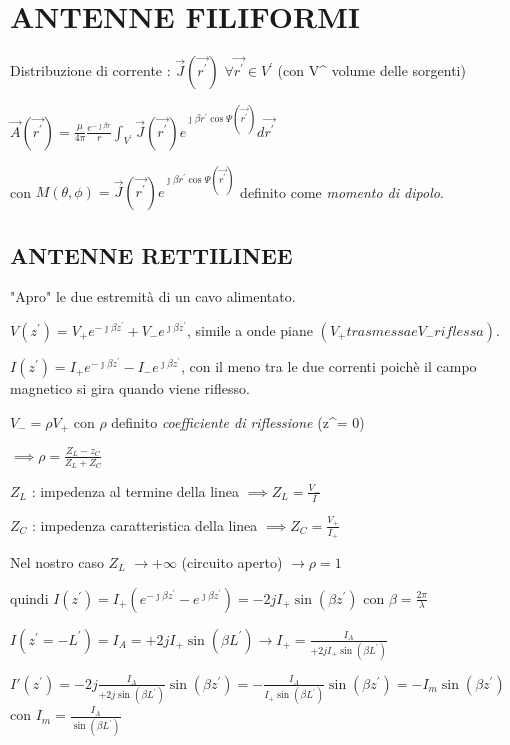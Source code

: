 \chapter{ANTENNE FILIFORMI}

Distribuzione di corrente : $\vec{J}(\vec{r^{\prime}})$ $\forall \vec{r^{\prime}}\in V^{\prime}$ (con V^{\prime} volume delle sorgenti)

$\vec{A}(\vec{r^{\prime}}) = \frac{\mu}{4\pi} \frac{e^{-\jmath\beta r}}{r} \int_{V^{\prime}} \vec{J}(\vec{r^{\prime}})e^{\jmath\beta r^{\prime}\cos \Psi (\vec{r^{\prime}})}d\vec{r^{\prime}}$

con $M(\theta,\phi) = \vec{J}(\vec{r^{\prime}})e^{\jmath\beta r^{\prime}\cos \Psi (\vec{r^{\prime}})}$ definito come  \textit{momento di dipolo}.

\section{ANTENNE RETTILINEE}

"Apro" le due estremità di un cavo alimentato.

$V(z^{\prime})=V_+ e^{-\jmath\beta z^{\prime}} + V_- e^{\jmath\beta z^{\prime}}$, simile a onde piane $(V_+ trasmessa e V_- riflessa)$.

$I(z^{\prime})=I_+ e^{-\jmath\beta z^{\prime}} - I_- e^{\jmath\beta z^{\prime}}$, con il meno tra le due correnti poichè il campo magnetico si gira quando viene riflesso.

$V_- = \rho V_+$ con $\rho$ definito \textit{coefficiente di riflessione} (z^{\prime}= 0)

$\implies \rho = \frac{Z_L - z_C}{Z_L + Z_C}$

$Z_L$ : impedenza al termine della linea $\implies Z_L = \frac{V_-}{I}$

$Z_C$ : impedenza caratteristica della linea $\implies Z_C = \frac{V_+}{I_+}$

Nel nostro caso $Z_L$ $\to +\infty$ (circuito aperto)  $\longrightarrow \rho = 1$

quindi $I(z^{\prime}) = I_+(e^{-\jmath\beta z^{\prime}} - e^{\jmath\beta z^{\prime}}) = -2j I_+ \sin (\beta z^{\prime})$ con $\beta = \frac{2 \pi}{\lambda}$

$I(z^{\prime} = -L^{\prime}) = I_A = +2j I_+ \sin (\beta L^{\prime}) \to I_+ = \frac{I_A}{+2j I_+ \sin (\beta L^{\prime})} $

$I'(z^{\prime}) =  -2j \frac{I_A}{+2j \sin (\beta L^{\prime})} \sin (\beta z^{\prime}) = - \frac{I_A}{I_+ \sin (\beta L^{\prime})} \sin (\beta z^{\prime}) = - I_m \sin (\beta z^{\prime}) $ con $I_m = \frac{I_A}{\sin (\beta L^{\prime})}$

